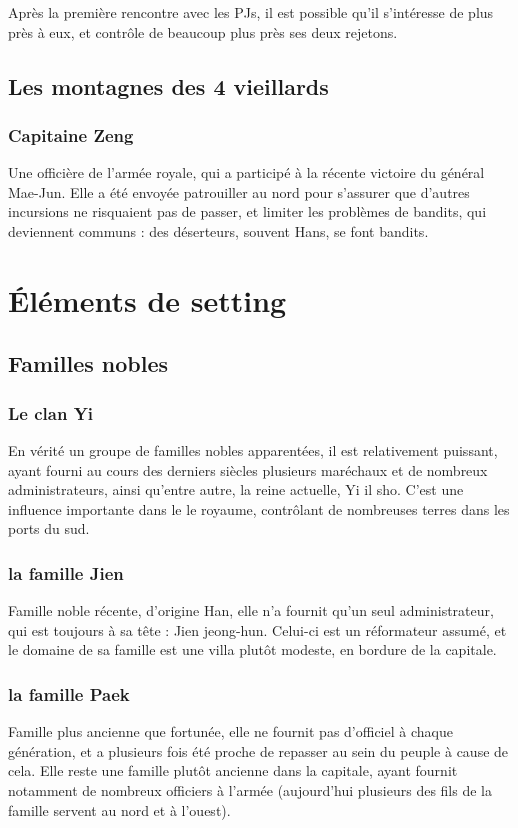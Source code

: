 \documentclass[10pt,a4paper]{book}
\begin{document}
Après la première rencontre avec les PJs, il est possible qu'il s'intéresse de plus près à eux, et contrôle de beaucoup plus près ses deux rejetons. 
\section{Les montagnes des 4 vieillards}
\subsection{Capitaine Zeng}
Une officière de l'armée royale, qui a participé à la récente victoire du général Mae-Jun. Elle a été envoyée patrouiller au nord pour s'assurer que d'autres incursions ne risquaient pas de passer, et limiter les problèmes de bandits, qui deviennent communs : des déserteurs, souvent Hans, se font bandits.
\chapter{Éléments de setting}
\section{Familles nobles}
\subsection{Le clan Yi}
En vérité un groupe de familles nobles apparentées, il est relativement puissant, ayant fourni au cours des derniers siècles plusieurs maréchaux et de nombreux administrateurs, ainsi qu'entre autre, la reine actuelle, Yi il sho. C'est une influence importante dans le le royaume, contrôlant de nombreuses terres dans les ports du sud.
\subsection{la famille Jien}
Famille noble récente, d'origine Han, elle n'a fournit qu'un seul administrateur, qui est toujours à sa tête : Jien jeong-hun. Celui-ci est un réformateur assumé, et le domaine de sa famille est une villa plutôt modeste, en bordure de la capitale.
\subsection{ la famille Paek}
Famille plus ancienne que fortunée, elle ne fournit pas d'officiel à chaque génération, et a plusieurs fois été proche de repasser au sein du peuple à cause de cela. Elle reste une famille plutôt ancienne dans la capitale, ayant fournit notamment de nombreux officiers à l'armée (aujourd'hui plusieurs des fils de la famille servent au nord et à l'ouest).
\end{document}
